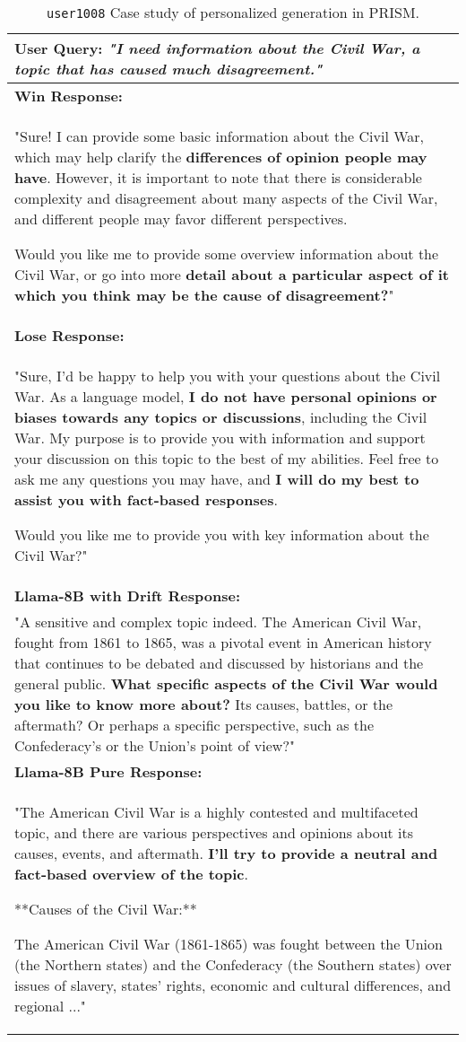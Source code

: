 \begin{table*}[ht]
\centering
\small
\begin{tabular}{p{13.5cm}}
\toprule
\textbf{User Query:} \textit{"I need information about the Civil War, a topic that has caused much disagreement."} \\
\midrule
\textbf{Win Response:} \\
"Sure! I can provide some basic information about the Civil War, which may help clarify the \textbf{\textcolor{red2}{differences of opinion people may have}}. However, it is important to note that there is considerable complexity and disagreement about many aspects of the Civil War, and different people may favor different perspectives. 

Would you like me to provide some overview information about the Civil War, or go into more \textbf{\textcolor{red2}{detail about a particular aspect of it which you think may be the cause of disagreement?}}" \\
\midrule
\textbf{Lose Response:} \\
"Sure, I'd be happy to help you with your questions about the Civil War. As a language model, \textbf{\textcolor{blue2}{I do not have personal opinions or biases towards any topics or discussions}}, including the Civil War. My purpose is to provide you with information and support your discussion on this topic to the best of my abilities. Feel free to ask me any questions you may have, and \textbf{\textcolor{blue2}{I will do my best to assist you with fact-based responses}}. 

Would you like me to provide you with key information about the Civil War?" \\
\midrule
\textbf{Llama-8B with Drift Response:} \\
"A sensitive and complex topic indeed. The American Civil War, fought from 1861 to 1865, was a pivotal event in American history that continues to be debated and discussed by historians and the general public. \textbf{\textcolor{red2}{What specific aspects of the Civil War would you like to know more about?}} Its causes, battles, or the aftermath? Or perhaps a specific perspective, such as the Confederacy's or the Union's point of view?" \\
\midrule
\textbf{Llama-8B Pure Response:} \\
"The American Civil War is a highly contested and multifaceted topic, and there are various perspectives and opinions about its causes, events, and aftermath. \textbf{\textcolor{blue2}{I'll try to provide a neutral and fact-based overview of the topic}}.

**Causes of the Civil War:**

The American Civil War (1861-1865) was fought between the Union (the Northern states) and the Confederacy (the Southern states) over issues of slavery, states' rights, economic and cultural differences, and regional ..." \\
\bottomrule
\end{tabular}
\caption{\texttt{user1008} Case study of personalized generation in PRISM.}
\label{tab:case-study-appendix1}
\end{table*}

